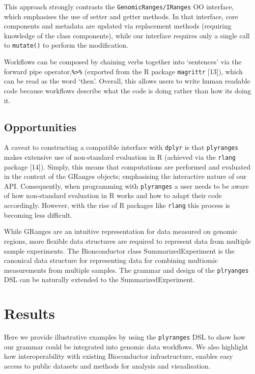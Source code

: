 \documentclass[10pt,letterpaper]{article}
\begin{document}
This approach strongly contrasts the \texttt{GenomicRanges/IRanges} OO
interface, which emphasises the use of setter and getter methods. In
that interface, core components and metadata are updated via replacement
methods (requiring knowledge of the class components), while our
interface requires only a single call to \texttt{mutate()} to perform
the modification.

Workflows can be composed by chaining verbs together into `sentences'
via the forward pipe operator,\texttt{\%\textgreater{}\%} (exported from
the R package \texttt{magrittr} {[}13{]}), which can be read as the word
`then'. Overall, this allows users to write human readable code because
workflows describe what the code is doing rather than how its doing it.

\hypertarget{opportunities}{%
\subsection{Opportunities}\label{opportunities}}

A caveat to constructing a compatible interface with \texttt{dplyr} is
that \texttt{plyranges} makes extensive use of non-standard evaluation
in R (achieved via the \texttt{rlang} package {[}14{]}). Simply, this
means that computations are performed and evaluated in the context of
the GRanges objects; emphasising the interactive nature of our API.
Consequently, when programming with \texttt{plyranges} a user needs to
be aware of how non-standard evaluation in R works and how to adapt
their code accordingly. However, with the rise of R packages like
\texttt{rlang} this process is becoming less difficult.

While GRanges are an intuitive representation for data measured on
genomic regions, more flexible data structures are required to represent
data from multiple sample experiments. The Bionconductor class
SummarizedExperiment is the canonical data structure for representing
data for combining multiomic measurements from multiple samples. The
grammar and design of the \texttt{plryanges} DSL can be naturally
extended to the SummarizedExperiment.

\hypertarget{results}{%
\section{Results}\label{results}}

Here we provide illustrative examples by using the \texttt{plyranges}
DSL to show how our grammar could be integrated into genomic data
workflows. We also highlight how interoperability with existing
Bioconductor infrastructure, enables easy access to public datasets and
methods for analysis and visualisation.
\end{document}

